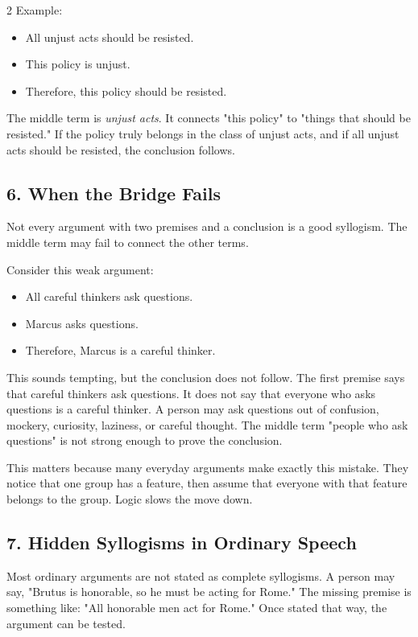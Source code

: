 \documentclass[12pt]{article}
\begin{document}
\begin{multicols}{2}
Example:

\begin{itemize}[leftmargin=*]
\item All unjust acts should be resisted.
\item This policy is unjust.
\item Therefore, this policy should be resisted.
\end{itemize}

The middle term is \textit{unjust acts}. It connects "this policy" to "things that should be resisted." If the policy truly belongs in the class of unjust acts, and if all unjust acts should be resisted, the conclusion follows.

\subsection*{6. When the Bridge Fails}
Not every argument with two premises and a conclusion is a good syllogism. The middle term may fail to connect the other terms.

Consider this weak argument:

\begin{itemize}[leftmargin=*]
\item All careful thinkers ask questions.
\item Marcus asks questions.
\item Therefore, Marcus is a careful thinker.
\end{itemize}

This sounds tempting, but the conclusion does not follow. The first premise says that careful thinkers ask questions. It does not say that everyone who asks questions is a careful thinker. A person may ask questions out of confusion, mockery, curiosity, laziness, or careful thought. The middle term "people who ask questions" is not strong enough to prove the conclusion.

This matters because many everyday arguments make exactly this mistake. They notice that one group has a feature, then assume that everyone with that feature belongs to the group. Logic slows the move down.

\subsection*{7. Hidden Syllogisms in Ordinary Speech}
Most ordinary arguments are not stated as complete syllogisms. A person may say, "Brutus is honorable, so he must be acting for Rome." The missing premise is something like: "All honorable men act for Rome." Once stated that way, the argument can be tested.


\end{multicols}
\end{document}
